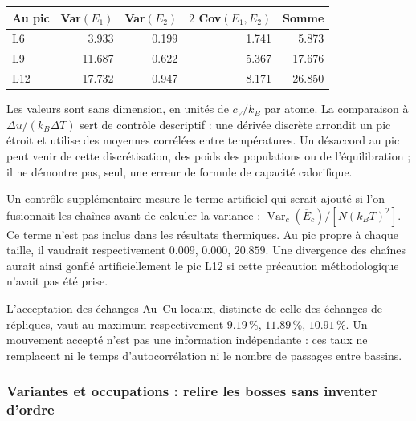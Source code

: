 
\begin{center}\small\begin{tabular}{lrrrr}\toprule

Au pic & Var$(E_1)$ & Var$(E_2)$ & $2$ Cov$(E_1,E_2)$ & Somme\\\midrule

L6 & 3.933 & 0.199 & 1.741 & 5.873\\

L9 & 11.687 & 0.622 & 5.367 & 17.676\\

L12 & 17.732 & 0.947 & 8.171 & 26.850\\

\bottomrule\end{tabular}\end{center}

Les valeurs sont sans dimension, en unités de $c_V/k_B$ par atome. La comparaison à $\Delta u/(k_B\Delta T)$ sert de contrôle descriptif : une dérivée discrète arrondit un pic étroit et utilise des moyennes corrélées entre températures. Un désaccord au pic peut venir de cette discrétisation, des poids des populations ou de l’équilibration ; il ne démontre pas, seul, une erreur de formule de capacité calorifique.

Un contrôle supplémentaire mesure le terme artificiel qui serait ajouté si l’on fusionnait les chaînes avant de calculer la variance : $\operatorname{Var}_c(\overline E_c)/[N(k_BT)^2]$. Ce terme n’est pas inclus dans les résultats thermiques. Au pic propre à chaque taille, il vaudrait respectivement $0.009$, $0.000$, $20.859$. Une divergence des chaînes aurait ainsi gonflé artificiellement le pic L12 si cette précaution méthodologique n’avait pas été prise.

L’acceptation des échanges Au--Cu locaux, distincte de celle des échanges de répliques, vaut au maximum respectivement $9.19\,\%$, $11.89\,\%$, $10.91\,\%$. Un mouvement accepté n’est pas une information indépendante : ces taux ne remplacent ni le temps d’autocorrélation ni le nombre de passages entre bassins.

\subsubsection{Variantes et occupations : relire les bosses sans inventer d’ordre}

